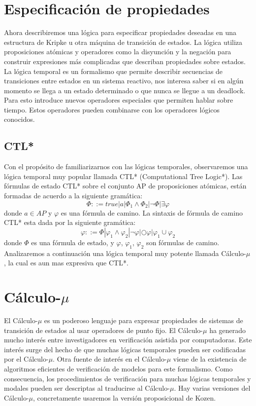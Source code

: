 \section{Especificación de propiedades}

Ahora describiremos una lógica para especificar propiedades deseadas en una estructura de Kripke u otra máquina de transición de estados. La lógica utiliza proposiciones atómicas y operadores como la disyunción y la negación para construir expresiones más complicadas que describan propiedades sobre estados.
La lógica temporal es un formalismo que permite describir secuencias de transiciones entre estados en un sistema reactivo, nos interesa saber si en algún momento se llega a un estado determinado o que nunca se llegue a un deadlock. Para esto introduce nuevos operadores especiales que permiten hablar sobre tiempo. Estos operadores pueden combinarse con los operadores lógicos conocidos.

\subsection{CTL*}

Con el propósito de familiarizarnos con las lógicas temporales, observaremos una lógica temporal muy popular llamada CTL* (Computational Tree Logic*).
Las fórmulas de estado CTL* sobre el conjunto AP de proposiciones atómicas, están formadas de acuerdo a la siguiente gramática\cite{Baier:2}:
\[\Phi ::= true | a | \Phi_{1} \land \Phi_{2} | \neg \Phi | \exists \varphi \]
donde $a \in AP$ y $\varphi$ es una fórmula de camino. La sintaxis de fórmula de camino CTL* esta dada por la siguiente gramática:
\[\varphi ::= \Phi | \varphi_{1} \land \varphi_{2} | \neg \varphi | \bigcirc \varphi | \varphi_{1} \cup \varphi_{2} \]
donde $\Phi$ es una fórmula de estado, y $\varphi$, $\varphi_{1}$, $\varphi_{2}$ son fórmulas de camino.
Analizaremos a continuación una lógica temporal muy potente llamada Cálculo-$\mu$, la cual es aun mas expresiva que CTL*.


\section{Cálculo-$\mu$}

El Cálculo-$\mu$ es un poderoso lenguaje para expresar propiedades de sistemas de transición de estados al usar operadores de punto fijo. El Cálculo-$\mu$ ha generado mucho interés entre investigadores en verificación asistida por computadoras. Este interés surge del hecho de que muchas lógicas temporales pueden ser codificadas por el Cálculo-$\mu$. Otra fuente de interés en el Cálculo-$\mu$ viene de la existencia de algoritmos eficientes de verificación de modelos para este formalismo. Como consecuencia, los procedimientos de verificación para muchas lógicas temporales y modales pueden ser descriptas al traducirse al Cálculo-$\mu$. Hay varias versiones del Cálculo-$\mu$, concretamente usaremos la versión proposicional de Kozen\cite{Kozen:3}.

